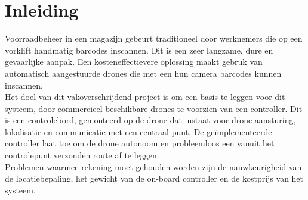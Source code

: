 \chapter*{Inleiding}
Voorraadbeheer in een magazijn gebeurt traditioneel door werknemers die op een vorklift handmatig barcodes inscannen.
Dit is een zeer langzame, dure en gevaarlijke aanpak.
Een kosteneffectievere oplossing maakt gebruk van automatisch aangestuurde drones die met een hun camera barcodes kunnen inscannen.\\

Het doel van dit vakoverschrijdend project is om een basis te leggen voor dit systeem, door commercieel beschikbare drones te voorzien van een controller.
Dit is een controlebord, gemonteerd op de drone dat instaat voor drone aansturing, lokalisatie en communicatie met een centraal punt. De ge\"implementeerde controller laat toe om de drone autonoom en probleemloos een vanuit het controlepunt verzonden route af te leggen.\\

Problemen waarmee rekening moet gehouden worden zijn de nauwkeurigheid van de locatiebepaling, het gewicht van de on-board controller en de kostprijs van het systeem.